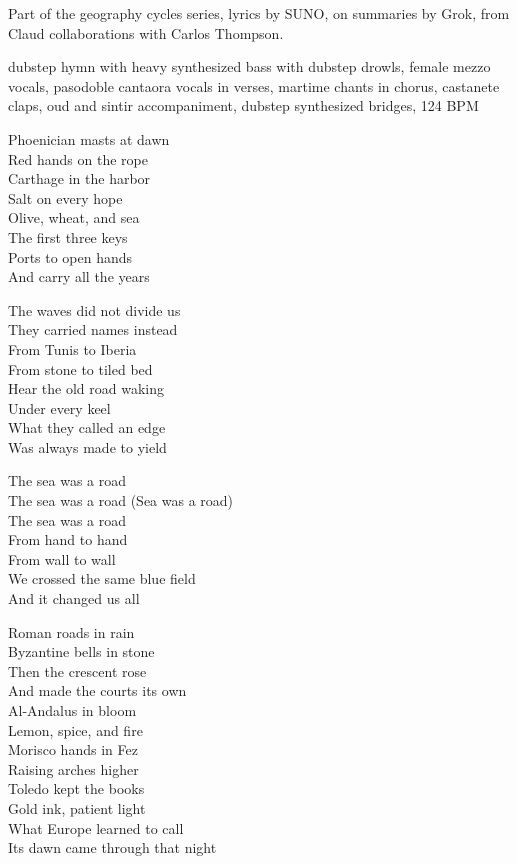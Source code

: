 
\begin{notes}
Part of the geography cycles series, lyrics by SUNO, on summaries by Grok, from Claud collaborations with Carlos Thompson.
\end{notes}
\begin{style}
dubstep hymn with heavy synthesized bass with dubstep drowls, female mezzo vocals, pasodoble cantaora vocals in verses, martime chants in chorus, castanete claps, oud and sintir accompaniment, dubstep synthesized bridges, 124 BPM
\end{style}
\begin{lyrics}
Phoenician masts at dawn\\
Red hands on the rope\\
Carthage in the harbor\\
Salt on every hope\\
Olive, wheat, and sea\\
The first three keys\\
Ports to open hands\\
And carry all the years

The waves did not divide us\\
They carried names instead\\
From Tunis to Iberia\\
From stone to tiled bed\\
Hear the old road waking\\
Under every keel\\
What they called an edge\\
Was always made to yield

The sea was a road\\
The sea was a road
(Sea was a road)\\
The sea was a road\\
From hand to hand\\
From wall to wall\\
We crossed the same blue field\\
And it changed us all

Roman roads in rain\\
Byzantine bells in stone\\
Then the crescent rose\\
And made the courts its own\\
Al-Andalus in bloom\\
Lemon, spice, and fire\\
Morisco hands in Fez\\
Raising arches higher\\
Toledo kept the books\\
Gold ink, patient light\\
What Europe learned to call\\
Its dawn came through that night


\end{lyrics}
